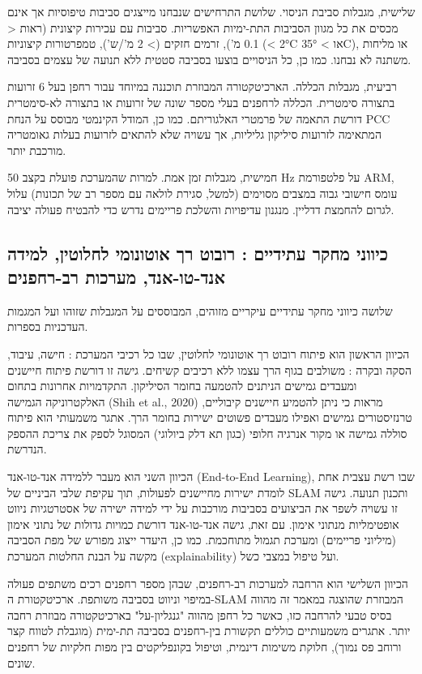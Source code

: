 שלישית, מגבלות סביבת הניסוי. שלושת התרחישים שנבחנו מייצגים סביבות טיפוסיות אך אינם מכסים את כל מגוון הסביבות התת-ימיות האפשריות. סביבות עם עכירות קיצונית (ראות < 0.1 מ'), זרמים חזקים (> 2 מ'/ש'), טמפרטורות קיצוניות (< 2°C או > 35°C), או מליחות משתנה לא נבחנו. כמו כן, כל הניסויים בוצעו בסביבה סטטית ללא תנועה של עצמים בסביבה.

רביעית, מגבלות הכללה. הארכיטקטורה המבוזרת תוכננה במיוחד עבור רחפן בעל 6 זרועות בתצורה סימטרית. הכללה לרחפנים בעלי מספר שונה של זרועות או בתצורה לא-סימטרית דורשת התאמה של פרמטרי האלגוריתם. כמו כן, המודל הקינמטי מבוסס על הנחת PCC המתאימה לזרועות סיליקון גליליות, אך עשויה שלא להתאים לזרועות בעלות גאומטריה מורכבת יותר.

חמישית, מגבלות זמן אמת. למרות שהמערכת פועלת בקצב 50 Hz על פלטפורמת ARM, עומס חישובי גבוה במצבים מסוימים (למשל, סגירת לולאה עם מספר רב של תכונות) עלול לגרום להחמצת דדליין. מנגנון עדיפויות והשלכת פריימים נדרש כדי להבטיח פעולה יציבה.

\subsection{כיווני מחקר עתידיים : רובוט רך אוטונומי לחלוטין, למידה אנד-טו-אנד, מערכות רב-רחפנים}
\label{sec:ch09_future}

שלושה כיווני מחקר עתידיים עיקריים מזוהים, המבוססים על המגבלות שזוהו ועל המגמות העדכניות בספרות.

הכיוון הראשון הוא פיתוח רובוט רך אוטונומי לחלוטין, שבו כל רכיבי המערכת : חישה, עיבוד, הסקה ובקרה : משולבים בגוף הרך עצמו ללא רכיבים קשיחים. גישה זו דורשת פיתוח חיישנים ומעבדים גמישים הניתנים להטמעה בחומר הסיליקון. התקדמויות אחרונות בתחום האלקטרוניקה הגמישה (Shih et al., 2020) מראות כי ניתן להטמיע חיישנים קיבוליים, טרנזיסטורים גמישים ואפילו מעבדים פשוטים ישירות בחומר הרך. אתגר משמעותי הוא פיתוח סוללה גמישה או מקור אנרגיה חלופי (כגון תא דלק ביולוגי) המסוגל לספק את צריכת ההספק הנדרשת.

הכיוון השני הוא מעבר ללמידה אנד-טו-אנד (End-to-End Learning), שבו רשת עצבית אחת לומדת ישירות מחיישנים לפעולות, תוך עקיפת שלבי הביניים של SLAM ותכנון תנועה. גישה זו עשויה לשפר את הביצועים בסביבות מורכבות על ידי למידה ישירה של אסטרטגיות ניווט אופטימליות מנתוני אימון. עם זאת, גישה אנד-טו-אנד דורשת כמויות גדולות של נתוני אימון (מיליוני פריימים) ומערכת תגמול מתוחכמת. כמו כן, היעדר ייצוג מפורש של מפת הסביבה מקשה על הבנת החלטות המערכת (explainability) ועל טיפול במצבי כשל.

הכיוון השלישי הוא הרחבה למערכות רב-רחפנים, שבהן מספר רחפנים רכים משתפים פעולה במיפוי וניווט בסביבה משותפת. ארכיטקטורת ה-SLAM המבוזרת שהוצגה במאמר זה מהווה בסיס טבעי להרחבה כזו, כאשר כל רחפן מהווה "גנגליון-על" בארכיטקטורה מבוזרת רחבה יותר. אתגרים משמעותיים כוללים תקשורת בין-רחפנים בסביבה תת-ימית (מוגבלת לטווח קצר ורוחב פס נמוך), חלוקת משימות דינמית, וטיפול בקונפליקטים בין מפות חלקיות של רחפנים שונים.

